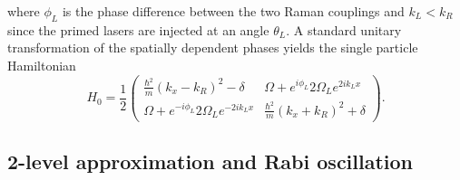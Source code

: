 \documentclass[twocolumn,prl,floatfix,citeautoscript,nofootinbib,superscriptaddress]{revtex4}
\begin{document}
where $\phi _{L}$ is the phase difference between the two Raman couplings
and $k_{L}<k_{R}$ since the primed lasers are injected at an angle $\theta
_{L}$. A standard unitary transformation of the spatially dependent phases
yields the single particle Hamiltonian
\begin{equation*}
H_{0}=\frac{1}{2}\left(
\begin{array}{cc}
\frac{\hbar^2}{m}(k_{x}-k_{R})^{2}-\delta & \Omega +e^{i\phi _{L}}2\Omega
_{L}e^{2ik_{L}x} \\
\Omega +e^{-i\phi _{L}}2\Omega _{L}e^{-2ik_{L}x} & \frac{\hbar^2}{m}%
(k_{x}+k_{R})^{2}+\delta%
\end{array}%
\right).
\end{equation*}

\subsection{2-level approximation and Rabi oscillation}
\end{document}
